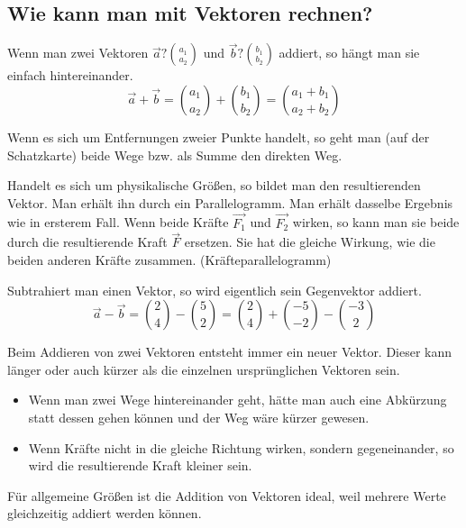 \newpage
\subsection{Wie kann man mit Vektoren rechnen?}

\hfill \break
Wenn man zwei Vektoren $\vec{a} ? \binom{a_1}{a_2}$ und $\vec{b} ? \binom{b_1}{b_2}$ addiert, so hängt man sie einfach hintereinander.
$$\vec{a}+\vec{b} = \binom{a_1}{a_2} + \binom{b_1}{b_2} = \binom{a_1+b_1}{a_2+b_2}$$

\hfill \break
Wenn es sich um Entfernungen zweier Punkte handelt, so geht man (auf der Schatzkarte) beide Wege bzw. als Summe den direkten Weg.

\hfill \break
Handelt es sich um physikalische Größen, so bildet man den resultierenden Vektor.
Man erhält ihn durch ein Parallelogramm. Man erhält dasselbe Ergebnis wie in ersterem Fall.
Wenn beide Kräfte $\vec{F_1}$ und $\vec{F_2}$ wirken, so kann man sie beide durch die resultierende Kraft $\vec{F}$ ersetzen.
Sie hat die gleiche Wirkung, wie die beiden anderen Kräfte zusammen. (Kräfteparallelogramm)

\hfill \break
Subtrahiert man einen Vektor, so wird eigentlich sein Gegenvektor addiert.
$$\vec{a} - \vec{b} = \binom{2}{4}-\binom{5}{2} = \binom{2}{4} + \binom{-5}{-2}-\binom{-3}{2}$$

\hfill \break
Beim Addieren von zwei Vektoren entsteht immer ein neuer Vektor. Dieser kann länger oder auch kürzer als die einzelnen ursprünglichen Vektoren sein.
\begin{itemize}
    \item Wenn man zwei Wege hintereinander geht, hätte man auch eine Abkürzung statt dessen gehen können und der Weg wäre kürzer gewesen.
    \item Wenn Kräfte nicht in die gleiche Richtung wirken, sondern gegeneinander, so wird die resultierende Kraft kleiner sein.
\end{itemize}

\hfill \break
Für allgemeine Größen ist die Addition von Vektoren ideal, weil mehrere Werte gleichzeitig addiert werden können.